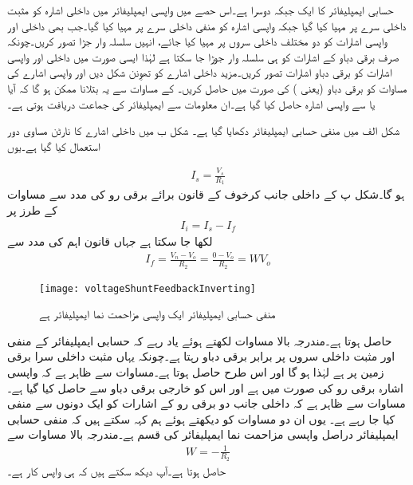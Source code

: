 حسابی ایمپلیفائر کا ایک  جبکہ دوسرا  ہے۔اس حصے میں واپسی ایمپلیفائر میں داخلی اشارہ  کو مثبت داخلی سرے  پر مہیا کیا گیا جبکہ واپسی اشارہ  کو منفی داخلی سرے پر مہیا کیا گیا۔جب بھی داخلی اور واپسی اشارات کو دو مختلف داخلی سروں  پر مہیا کیا جائے، انہیں سلسلہ وار جڑا تصور کریں۔چونکہ صرف برقی دباو کے اشارات کو ہی سلسلہ وار جوڑا جا سکتا ہے لہٰذا ایسی صورت میں داخلی اور واپسی اشارات کو برقی دباو اشارات تصور کریں۔مزید داخلی اشارے کو تھوِنن  شکل دیں اور واپسی اشارے کی مساوات کو برقی دباو (یعنی )  کی صورت میں حاصل کریں۔  کے مساوات سے یہ بتلانا ممکن ہو گا کہ آیا  یا  سے واپسی اشارہ حاصل کیا گیا ہے۔ان معلومات سے ایمپلیفائر کی جماعت دریافت ہوتی ہے۔

شکل  الف میں منفی حسابی ایمپلیفائر دکھایا گیا ہے۔ شکل  ب میں داخلی اشارے کا نارٹن مساوی دور استعمال کیا گیا ہے۔یوں

\begin{align} \label{مساوات_واپسی_داخلی_نارٹن_اشارہ}
I_s=\frac{V_s}{R_1}
\end{align}
ہو گا۔شکل  پ کے داخلی جانب کرخوف کے قانون برائے برقی رو کی مدد سے مساوات  کے طرز پر
\begin{align} \label{مساوات_واپسی_واپسی_مزاحمت_نما_ایمپلیفائر_کی_جماعت_بندی}
I_i=I_s-I_f
\end{align}
لکھا جا سکتا ہے جہاں قانون اہم کی مدد سے 
\begin{align} \label{مساوات_واپسی_منفی_واپس_کار}
I_f=\frac{V_n-V_o}{R_2}=\frac{0-V_o}{R_2}=W V_o
\end{align}
%
\begin{figure}
\centering
\texttt{[image: voltageShuntFeedbackInverting]}
\caption{منفی حسابی ایمپلیفائر ایک واپسی مزاحمت نما ایمپلیفائر ہے}
\label{شکل_واپسی_منفی_واپسی_ایمپلیفائر}
\end{figure}
%
حاصل ہوتا ہے۔مندرجہ بالا مساوات لکھتے ہوئے یاد رہے کہ حسابی ایمپلیفائر کے منفی اور مثبت داخلی سروں  پر برابر برقی دباو رہتا ہے۔چونکہ یہاں مثبت داخلی سرا برقی زمین پر ہے لہٰذا  ہو گا اور اس طرح  حاصل ہوتا ہے۔مساوات  سے ظاہر ہے کہ واپسی اشارہ برقی رو کی صورت میں ہے اور اس کو خارجی برقی دباو سے حاصل کیا گیا ہے۔مساوات  سے ظاہر ہے کہ داخلی جانب دو برقی رو کے اشارات کو ایک دونوں سے منفی کیا جا رہے ہے۔  یوں ان دو مساوات کو دیکھتے ہوئے ہم کہہ سکتے ہیں کہ منفی حسابی ایمپلیفائر دراصل واپسی مزاحمت نما ایمپلیفائر کی قسم ہے۔مندرجہ بالا مساوات سے
\begin{align}
W=-\frac{1}{R_2}
\end{align}
حاصل ہوتا ہے۔آپ دیکھ سکتے ہیں کہ  ہی واپس کار ہے۔

